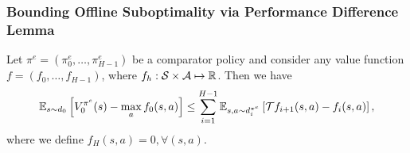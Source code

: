 \subsubsection{Bounding Offline Suboptimality via Performance Difference Lemma}
\begin{lemma} 
\label{lemma:perf-diff-comparator}
Let $\pi^e=(\pi_0^e,\dots,\pi_{H-1}^e)$ be a comparator policy and consider any value function $f=(f_0,\dots,f_{H-1})$, where $f_h:\mathcal S\times \mathcal A\mapsto \mathbb R$. Then we have
\begin{equation}
    \mathbb E_{s\sim d_0}\left[ V_0^{\pi^e}(s)-\max_a f_0(s,a) \right]\leq \sum_{i=1}^{H-1}\mathbb E_{s,a\sim d_i^{\pi^e}}\left[ \mathcal Tf_{i+1}(s,a)-f_i(s,a) \right],
\end{equation}
where we define $f_H(s,a)=0,\forall (s,a)$.
\end{lemma}


